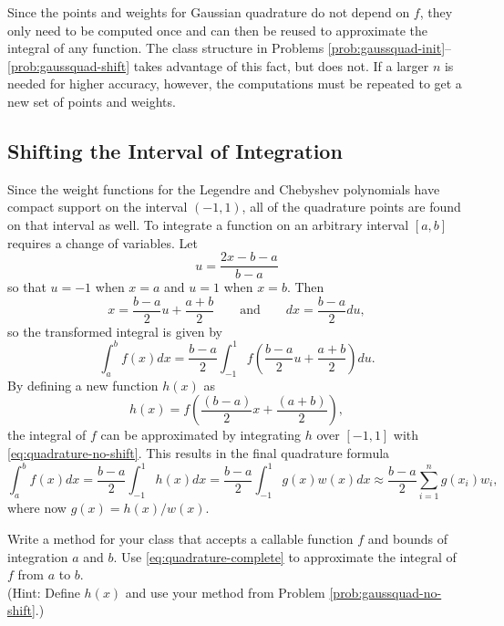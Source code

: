 \begin{info}
Since the points and weights for Gaussian quadrature do not depend on $f$, they only need to be computed once and can then be reused to approximate the integral of any function.
The class structure in Problems \ref{prob:gaussquad-init}--\ref{prob:gaussquad-shift} takes advantage of this fact, but  does not.
If a larger $n$ is needed for higher accuracy, however, the computations must be repeated to get a new set of points and weights.
\end{info}

\subsection*{Shifting the Interval of Integration} %

Since the weight functions for the Legendre and Chebyshev polynomials have compact support on the interval $(-1,1)$, all of the quadrature points are found on that interval as well.
To integrate a function on an arbitrary interval $[a,b]$ requires a change of variables.
Let \[u = \frac{2x - b - a}{b - a}\] so that $u = -1$ when $x = a$ and $u = 1$ when $x=b$.
Then
\[
x = \frac{b - a}{2}u + \frac{a + b}{2}\qquad \text{and}\qquad dx = \frac{b - a}{2}du,
\]
so the transformed integral is given by
\[
\int_a^b f(x) dx = \frac{b-a}{2}\int_{-1}^1 f\left(\frac{b-a}{2}u + \frac{a+b}{2}\right)du.
\]
By defining a new function $h(x)$ as
\[
h(x) = f\left(\frac{(b-a)}{2}x + \frac{(a+b)}{2}\right),
\]
the integral of $f$ can be approximated by integrating $h$ over $[-1,1]$ with \eqref{eq:quadrature-no-shift}.
This results in the final quadrature formula
\begin{equation}
\int_{a}^{b} f(x) dx = \frac{b-a}{2}\int_{-1}^1 h(x)dx = \frac{b-a}{2}\int_{-1}^1 g(x)w(x)dx \approx \frac{b-a}{2}\sum_{i=1}^n g(x_i)w_i,
\label{eq:quadrature-complete}
\end{equation}
where now $g(x) = h(x) / w(x)$.

\begin{problem} %
Write a method for your class that accepts a callable function $f$ and bounds of integration $a$ and $b$.
Use \eqref{eq:quadrature-complete} to approximate the integral of $f$ from $a$ to $b$.
\\(Hint: Define $h(x)$ and use your method from Problem \ref{prob:gaussquad-no-shift}.)
\label{prob:gaussquad-shift}
\end{problem}


